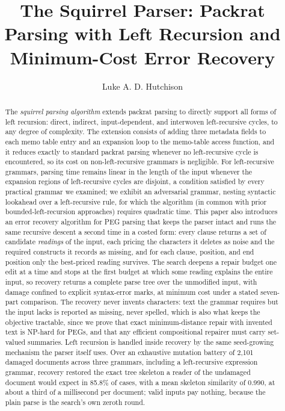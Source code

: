 \documentclass[manuscript]{acmart}
\begin{document}
\title[The Squirrel Parser]{The Squirrel Parser: Packrat Parsing with Left Recursion and Minimum-Cost Error Recovery}

\author{Luke A. D. Hutchison}

\begin{abstract}
The \emph{squirrel parsing algorithm} extends packrat parsing to directly support all forms of left recursion: direct, indirect, input-dependent, and interwoven left-recursive cycles, to any degree of complexity. The extension consists of adding three metadata fields to each memo table entry and an expansion loop to the memo-table access function, and it reduces exactly to standard packrat parsing whenever no left-recursive cycle is encountered, so its cost on non-left-recursive grammars is negligible. For left-recursive grammars, parsing time remains linear in the length of the input whenever the expansion regions of left-recursive cycles are disjoint, a condition satisfied by every practical grammar we examined; we exhibit an adversarial grammar, nesting syntactic lookahead over a left-recursive rule, for which the algorithm (in common with prior bounded-left-recursion approaches) requires quadratic time. This paper also introduces an error recovery algorithm for PEG parsing that keeps the parser intact and runs the same recursive descent a second time in a costed form: every clause returns a set of candidate \emph{readings} of the input, each pricing the characters it deletes as noise and the required constructs it records as missing, and for each clause, position, and end position only the best-priced reading survives. The search deepens a repair budget one edit at a time and stops at the first budget at which some reading explains the entire input, so recovery returns a complete parse tree over the unmodified input, with damage confined to explicit syntax-error marks, at minimum cost under a stated seven-part comparison. The recovery never invents characters: text the grammar requires but the input lacks is reported as missing, never spelled, which is also what keeps the objective tractable, since we prove that exact minimum-distance repair with invented text is NP-hard for PEGs, and that any efficient compositional repairer must carry set-valued summaries. Left recursion is handled inside recovery by the same seed-growing mechanism the parser itself uses. Over an exhaustive mutation battery of 2{,}101 damaged documents across three grammars, including a left-recursive expression grammar, recovery restored the exact tree skeleton a reader of the undamaged document would expect in 85.8\% of cases, with a mean skeleton similarity of 0.990, at about a third of a millisecond per document; valid inputs pay nothing, because the plain parse is the search's own zeroth round.
\end{abstract}
\end{document}
